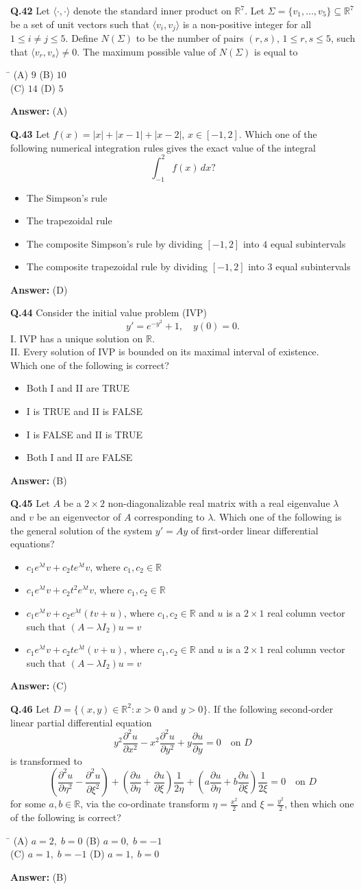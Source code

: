 \documentclass[11pt,a4paper]{article}
\newcommand{\optsfourA}[4]{%
  \begin{tabbing}
    \hspace{0.48\linewidth}\=\kill
    (A) #1 \> (B) #2 \\[2pt]
    (C) #3 \> (D) #4
  \end{tabbing}%
}
\newcommand{\optslistA}[4]{%
  \begin{itemize}
    \setlength{\itemsep}{2pt}\setlength{\parskip}{0pt}
    \item[(A)] #1
    \item[(B)] #2
    \item[(C)] #3
    \item[(D)] #4
  \end{itemize}%
}
\newcommand{\ans}[1]{\textbf{Answer:} #1\par\medskip}
\begin{document}
\textbf{Q.42} Let $\langle \cdot, \cdot \rangle$ denote the standard inner product on $\mathbb{R}^7$. Let $\Sigma = \{v_1, \ldots, v_5\} \subseteq \mathbb{R}^7$ be a set of unit vectors such that $\langle v_i, v_j \rangle$ is a non-positive integer for all $1 \le i \ne j \le 5$. Define $N(\Sigma)$ to be the number of pairs $(r, s)$, $1 \le r, s \le 5$, such that $\langle v_r, v_s \rangle \ne 0$. The maximum possible value of $N(\Sigma)$ is equal to
\optsfourA{$9$}{$10$}{$14$}{$5$}
\ans{(A)}

\textbf{Q.43} Let $f(x) = |x| + |x - 1| + |x - 2|$, $x \in [-1, 2]$. Which one of the following numerical integration rules gives the exact value of the integral
\[
  \int_{-1}^{2} f(x)\,dx?
\]
\optslistA{The Simpson's rule}{The trapezoidal rule}{The composite Simpson's rule by dividing $[-1, 2]$ into $4$ equal subintervals}{The composite trapezoidal rule by dividing $[-1, 2]$ into $3$ equal subintervals}
\ans{(D)}

\textbf{Q.44} Consider the initial value problem (IVP)
\[
  y' = e^{-y^2} + 1, \quad y(0) = 0.
\]
I. IVP has a unique solution on $\mathbb{R}$.\\
II. Every solution of IVP is bounded on its maximal interval of existence.\\
Which one of the following is correct?
\optslistA{Both I and II are TRUE}{I is TRUE and II is FALSE}{I is FALSE and II is TRUE}{Both I and II are FALSE}
\ans{(B)}

\textbf{Q.45} Let $A$ be a $2 \times 2$ non-diagonalizable real matrix with a real eigenvalue $\lambda$ and $v$ be an eigenvector of $A$ corresponding to $\lambda$. Which one of the following is the general solution of the system $y' = Ay$ of first-order linear differential equations?
\optslistA{$c_1 e^{\lambda t} v + c_2 t e^{\lambda t} v$, where $c_1, c_2 \in \mathbb{R}$}{$c_1 e^{\lambda t} v + c_2 t^2 e^{\lambda t} v$, where $c_1, c_2 \in \mathbb{R}$}{$c_1 e^{\lambda t} v + c_2 e^{\lambda t}(tv + u)$, where $c_1, c_2 \in \mathbb{R}$ and $u$ is a $2 \times 1$ real column vector such that $(A - \lambda I_2)u = v$}{$c_1 e^{\lambda t} v + c_2 t e^{\lambda t}(v + u)$, where $c_1, c_2 \in \mathbb{R}$ and $u$ is a $2 \times 1$ real column vector such that $(A - \lambda I_2)u = v$}
\ans{(C)}

\textbf{Q.46} Let $D = \{(x, y) \in \mathbb{R}^2 : x > 0 \text{ and } y > 0\}$. If the following second-order linear partial differential equation
\[
  y^2 \frac{\partial^2 u}{\partial x^2} - x^2 \frac{\partial^2 u}{\partial y^2} + y \frac{\partial u}{\partial y} = 0 \quad \text{on } D
\]
is transformed to
\[
  \left(\frac{\partial^2 u}{\partial \eta^2} - \frac{\partial^2 u}{\partial \xi^2}\right) + \left(\frac{\partial u}{\partial \eta} + \frac{\partial u}{\partial \xi}\right)\frac{1}{2\eta} + \left(a \frac{\partial u}{\partial \eta} + b \frac{\partial u}{\partial \xi}\right)\frac{1}{2\xi} = 0 \quad \text{on } D
\]
for some $a, b \in \mathbb{R}$, via the co-ordinate transform $\eta = \frac{x^2}{2}$ and $\xi = \frac{y^2}{2}$, then which one of the following is correct?
\optsfourA{$a = 2, \; b = 0$}{$a = 0, \; b = -1$}{$a = 1, \; b = -1$}{$a = 1, \; b = 0$}
\ans{(B)}
\end{document}
